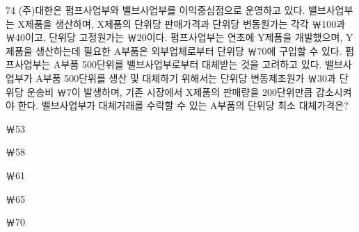 \begin{question}{74}
(주)대한은 펌프사업부와 밸브사업부를 이익중심점으로 운영하고 있다. 밸브사업부는 X제품을 생산하며, X제품의 단위당 판매가격과 단위당 변동원가는 각각 ￦100과 ￦40이고, 단위당 고정원가는 ￦20이다. 펌프사업부는 연초에 Y제품을 개발했으며, Y제품을 생산하는데 필요한 A부품은 외부업체로부터 단위당 ￦70에 구입할 수 있다. 펌프사업부는 A부품 500단위를 밸브사업부로부터 대체받는 것을 고려하고 있다. 밸브사업부가 A부품 500단위를 생산 및 대체하기 위해서는 단위당 변동제조원가 ￦30과 단위당 운송비 ￦7이 발생하며, 기존 시장에서 X제품의 판매량을 200단위만큼 감소시켜야 한다. 밸브사업부가 대체거래를 수락할 수 있는 A부품의 단위당 최소 대체가격은?
\begin{choices}
  \item ￦53
  \item ￦58
  \item ￦61
  \item ￦65
  \item ￦70
\end{choices}
\end{question}
